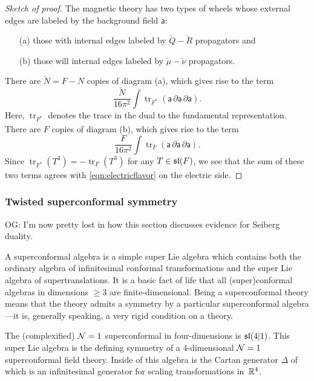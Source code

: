 \documentclass[11pt]{amsart}
\def\SU{{\rm SU}}
\def\sfa{\mathsf{a}}
\renewcommand{\op}{\operatorname}
\def\owen#1{{\textcolor{violet!65!black}{OG: {#1}}}}
\begin{document}
\begin{proof}[Sketch of proof]
The magnetic theory has two types of wheels whose external edges are labeled by the background field $\sfa$: 
\begin{itemize}
\item[(a)] those with  internal edges labeled by $\check{Q}-\check{R}$ propagators and 
\item[(b)] those will internal edges labeled by $\check{\mu}-\check{\nu}$ propagators. 
\end{itemize}
There are $\check{N} = F - N$ copies of diagram (a), which gives rise to the term
\[
 \frac{\check{N}}{16 \pi^2} \int \op{tr}_{\underline{F}^*} \left(\sfa \, \partial \sfa \, \partial \sfa\right) .
\]
Here, $\op{tr}_{\underline{F}^*}$ denotes the trace in the dual to the fundamental representation. 
There are $F$ copies of diagram (b), which gives rise to the term
\[
\frac{F}{16\pi^2}\int \op{tr}_{\underline{F}} \left(\sfa\, \partial \sfa \, \partial \sfa\right).
\]
Since $\op{tr}_{\underline{F}^*} (T^3) = - \op{tr}_{\underline{F}} (T^3)$ for any $T \in \sl(F)$, 
we see that the sum of these two terms agrees with \eqref{eqn:electricflavor} on the electric side.
\end{proof}

\subsubsection{Twisted superconformal symmetry}

\owen{I'm now pretty lost in how this section discusses evidence for Seiberg duality.}

A superconformal algebra is a simple super Lie algebra which contains both the ordinary algebra of infinitesimal conformal transformations and the super Lie algebra of supertranslations.
It is a basic fact of life that all (super)conformal algebras in dimensions $\geq 3$ are finite-dimensional.
Being a superconformal theory means that the theory admits a symmetry by a particular superconformal algebra---it is, generally speaking, a very rigid condition on a theory. 

The (complexified) $\cN=1$ superconformal in four-dimensions is $\sl(4|1)$.
This super Lie algebra is the defining symmetry of a 4-dimensional $\cN=1$ superconformal field theory. 
Inside of this algebra is the Cartan generator $\Delta$ of which is an infinitesimal generator for scaling transformations in~$\RR^4$.
\end{document}
